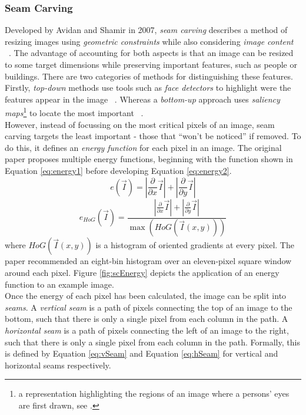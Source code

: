 \subsubsection{Seam Carving}
\label{sec:seamCarving}
\setlength{\leftskip}{0.5cm}
\indent \indent
Developed by Avidan and Shamir in 2007, \textit{seam carving} describes a method of resizing images using \textit{geometric constraints} while also considering \textit{image content} ~\cite{SeamCarving}. The advantage of accounting for both aspects is that an image can be resized to some target dimensions while preserving important features, such as people or buildings. There are two categories of methods for distinguishing these features. Firstly, \textit{top-down} methods use tools such as \textit{face detectors} to highlight were the features appear in the image ~\cite{Viola}. Whereas a \textit{bottom-up} approach uses \textit{saliency maps}\footnote{a representation highlighting the regions of an image where a persons' eyes are first drawn, see \cite{Saliency}.} to locate the most important ~\cite{Itti}.
\smallskip \\ \indent
However, instead of focussing on the most critical pixels of an image, seam carving targets the least important - those that ``won't be noticed'' if removed. To do this, it defines an \textit{energy function} for each pixel in an image. The original paper proposes multiple energy functions, beginning with the function shown in Equation \ref{eq:energy1} before developing Equation \ref{eq:energy2}.
\begin{equation}
    \label{eq:energy1}
    e(\vec{I}) = \left| \frac{\partial}{\partial x} \vec{I} \right| + \left| \frac{\partial}{\partial y} \vec{I} \right|
\end{equation}
\begin{equation}
    \label{eq:energy2}
    e_{\textit{HoG}}(\vec{I}) = \frac{\left| \frac{\partial}{\partial x} \vec{I} \right| + \left| \frac{\partial}{\partial y} \vec{I} \right|}{\max{(\textit{HoG}(\vec{I}(x,y)))}}
\end{equation}
where $\textit{HoG}(\vec{I}(x,y))$ is a histogram of oriented gradients at every pixel. The paper recommended an eight-bin histogram over an eleven-pixel square window around each pixel. Figure \ref{fig:scEnergy} depicts the application of an energy function to an example image.
\smallskip \\ \indent
Once the energy of each pixel has been calculated, the image can be split into \textit{seams}. A \textit{vertical seam} is a path of pixels connecting the top of an image to the bottom, such that there is only a single pixel from each column in the path. A \textit{horizontal seam} is a path of pixels connecting the left of an image to the right, such that there is only a single pixel from each column in the path. Formally, this is defined by Equation \ref{eq:vSeam} and Equation \ref{eq:hSeam} for vertical and horizontal seams respectively.
